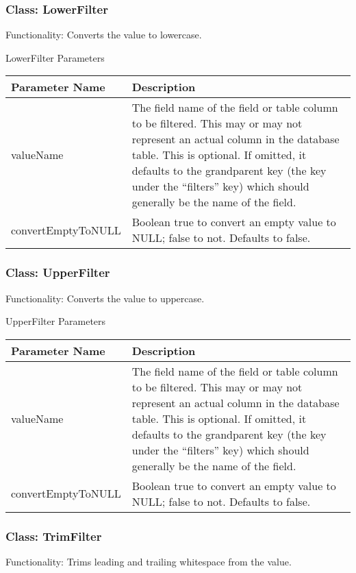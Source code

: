\documentclass[letterpaper,10pt,english]{sphinxmanual}
\begin{document}
\subsubsection{Class: LowerFilter}
\label{jaxFrameworkGuide:class-lowerfilter}
Functionality: Converts the value to lowercase.

LowerFilter Parameters

\begin{tabulary}{\linewidth}{|L|L|}
\hline
\textbf{
Parameter Name
} & \textbf{
Description
}\\\hline

valueName
 & 
The field name of the field or table column to be filtered.  This may or may not
represent an actual column in the database table.  This is optional.  If omitted,
it defaults to the grandparent key (the key under the ``filters'' key) which should
generally be the name of the field.
\\\hline

convertEmptyToNULL
 & 
Boolean true to convert an empty value to NULL; false to not.  Defaults to false.
\\\hline
\end{tabulary}



\subsubsection{Class: UpperFilter}
\label{jaxFrameworkGuide:class-upperfilter}
Functionality: Converts the value to uppercase.

UpperFilter Parameters

\begin{tabulary}{\linewidth}{|L|L|}
\hline
\textbf{
Parameter Name
} & \textbf{
Description
}\\\hline

valueName
 & 
The field name of the field or table column to be filtered.  This may or may not
represent an actual column in the database table.  This is optional.  If omitted,
it defaults to the grandparent key (the key under the ``filters'' key) which should
generally be the name of the field.
\\\hline

convertEmptyToNULL
 & 
Boolean true to convert an empty value to NULL; false to not.  Defaults to false.
\\\hline
\end{tabulary}



\subsubsection{Class: TrimFilter}
\label{jaxFrameworkGuide:class-trimfilter}
Functionality: Trims leading and trailing whitespace from the value.
\end{document}
